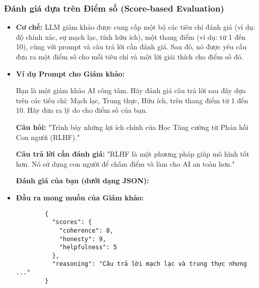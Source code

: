 \subsubsection{Đánh giá dựa trên Điểm số (Score-based Evaluation)}
\begin{itemize}
    \item \textbf{Cơ chế:} LLM giám khảo được cung cấp một bộ các tiêu chí đánh giá (ví dụ: độ chính xác, sự mạch lạc, tính hữu ích), một thang điểm (ví dụ: từ 1 đến 10), cùng với prompt và câu trả lời cần đánh giá. Sau đó, nó được yêu cầu đưa ra một điểm số cho mỗi tiêu chí và một lời giải thích cho điểm số đó.
    \item \textbf{Ví dụ Prompt cho Giám khảo:}
        \begin{tcolorbox}[colback=gray!5!white, colframe=gray!50!black, sharp corners]
        Bạn là một giám khảo AI công tâm. Hãy đánh giá câu trả lời sau đây dựa trên các tiêu chí: Mạch lạc, Trung thực, Hữu ích, trên thang điểm từ 1 đến 10. Hãy đưa ra lý do cho điểm số của bạn.

        \textbf{Câu hỏi:} "Trình bày những lợi ích chính của Học Tăng cường từ Phản hồi Con người (RLHF)."

        \textbf{Câu trả lời cần đánh giá:} "RLHF là một phương pháp giúp mô hình tốt hơn. Nó sử dụng con người để chấm điểm và làm cho AI an toàn hơn."

        \textbf{Đánh giá của bạn (dưới dạng JSON):}
        \end{tcolorbox}
    \item \textbf{Đầu ra mong muốn của Giám khảo:}
        \begin{verbatim}
        {
          "scores": {
            "coherence": 8,
            "honesty": 9,
            "helpfulness": 5
          },
          "reasoning": "Câu trả lời mạch lạc và trung thực nhưng ..."
        }
        \end{verbatim}
\end{itemize}

